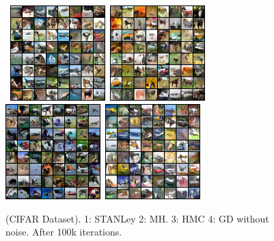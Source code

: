 \documentclass[10pt,twocolumn,letterpaper]{article}
\begin{document}
\begin{figure}[H]
\begin{center}
    \mbox{
        \includegraphics[width=1.45in]{figs/cifaranila}
        \includegraphics[width=1.45in]{figs/mh_x_q_099900}
        }\vspace{0.05in}
            \mbox{
                \includegraphics[width=1.45in]{figs/hmc_x_q_099900}
                        \includegraphics[width=1.45in]{figs/gd_x_q_099900}
        }
\end{center}
\caption{(CIFAR Dataset). 1: STANLey 2: MH. 3: HMC 4: GD without noise. After 100k iterations.}
	\label{fig:cifar}
\end{figure}
\end{document}
